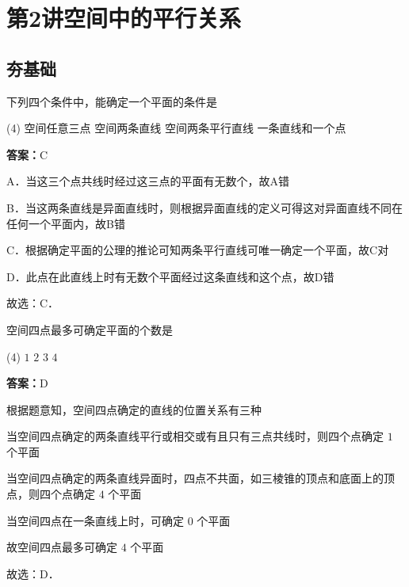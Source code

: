 \section{第2讲\quad 空间中的平行关系}
\subsection{夯基础}

\begin{example}[\bkstar{2}{5}]
下列四个条件中，能确定一个平面的条件是
\begin{tasks}(4)
    \task 空间任意三点
    \task 空间两条直线
    \task 空间两条平行直线
    \task 一条直线和一个点
\end{tasks}
\end{example}
\begin{solution}
\textbf{答案：}C

A．当这三个点共线时经过这三点的平面有无数个，故A错

B．当这两条直线是异面直线时，则根据异面直线的定义可得这对异面直线不同在任何一个平面内，故B错

C．根据确定平面的公理的推论可知两条平行直线可唯一确定一个平面，故C对

D．此点在此直线上时有无数个平面经过这条直线和这个点，故D错

故选：C．
\end{solution}

\vspace{2em}

\begin{example}[\bkstar{2}{5}]
空间四点最多可确定平面的个数是
\begin{tasks}(4)
    \task $1$
    \task $2$
    \task $3$
    \task $4$
\end{tasks}
\end{example}
\begin{solution}
\textbf{答案：}D

根据题意知，空间四点确定的直线的位置关系有三种

当空间四点确定的两条直线平行或相交或有且只有三点共线时，则四个点确定 $1$ 个平面

当空间四点确定的两条直线异面时，四点不共面，如三棱锥的顶点和底面上的顶点，则四个点确定 $4$ 个平面

当空间四点在一条直线上时，可确定 $0$ 个平面

故空间四点最多可确定 $4$ 个平面

故选：D．
\end{solution}

